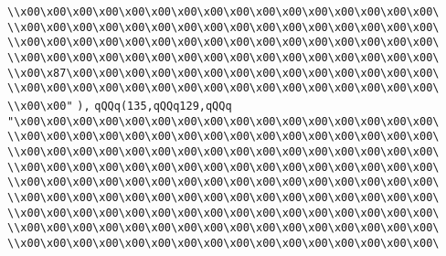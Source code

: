 \verb|\\x00\x00\x00\x00\x00\x00\x00\x00\x00\x00\x00\x00\x00\x00\x00\x00\|\newline
\verb|\\x00\x00\x00\x00\x00\x00\x00\x00\x00\x00\x00\x00\x00\x00\x00\x00\|\newline
\verb|\\x00\x00\x00\x00\x00\x00\x00\x00\x00\x00\x00\x00\x00\x00\x00\x00\|\newline
\verb|\\x00\x00\x00\x00\x00\x00\x00\x00\x00\x00\x00\x00\x00\x00\x00\x00\|\newline
\verb|\\x00\x87\x00\x00\x00\x00\x00\x00\x00\x00\x00\x00\x00\x00\x00\x00\|\newline
\verb|\\x00\x00\x00\x00\x00\x00\x00\x00\x00\x00\x00\x00\x00\x00\x00\x00\|\newline
\verb|\\x00\x00"|\newline
\verb|),|\newline
\verb|qQQq(135,qQQq129,qQQq|\newline
\verb|"\x00\x00\x00\x00\x00\x00\x00\x00\x00\x00\x00\x00\x00\x00\x00\x00\|\newline
\verb|\\x00\x00\x00\x00\x00\x00\x00\x00\x00\x00\x00\x00\x00\x00\x00\x00\|\newline
\verb|\\x00\x00\x00\x00\x00\x00\x00\x00\x00\x00\x00\x00\x00\x00\x00\x00\|\newline
\verb|\\x00\x00\x00\x00\x00\x00\x00\x00\x00\x00\x00\x00\x00\x00\x00\x00\|\newline
\verb|\\x00\x00\x00\x00\x00\x00\x00\x00\x00\x00\x00\x00\x00\x00\x00\x00\|\newline
\verb|\\x00\x00\x00\x00\x00\x00\x00\x00\x00\x00\x00\x00\x00\x00\x00\x00\|\newline
\verb|\\x00\x00\x00\x00\x00\x00\x00\x00\x00\x00\x00\x00\x00\x00\x00\x00\|\newline
\verb|\\x00\x00\x00\x00\x00\x00\x00\x00\x00\x00\x00\x00\x00\x00\x00\x00\|\newline
\verb|\\x00\x00\x00\x00\x00\x00\x00\x00\x00\x00\x00\x00\x00\x00\x00\x00\|\newline
